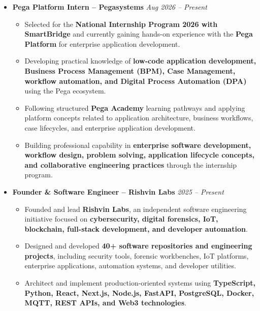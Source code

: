 \documentclass[a4paper,11pt]{article}
\newcommand{\resumeItem}[1]{
\item \small{#1 \vspace{-2pt}}
}
\begin{document}
\begin{itemize}[leftmargin=0in, label={}]

\item
\textbf{Pega Platform Intern -- Pegasystems}
\hfill \textit{Aug 2026 -- Present}

\begin{itemize}[leftmargin=*]

\resumeItem{Selected for the \textbf{National Internship Program 2026 with SmartBridge} and currently gaining hands-on experience with the \textbf{Pega Platform} for enterprise application development.}

\resumeItem{Developing practical knowledge of \textbf{low-code application development, Business Process Management (BPM), Case Management, workflow automation, and Digital Process Automation (DPA)} using the Pega ecosystem.}

\resumeItem{Following structured \textbf{Pega Academy} learning pathways and applying platform concepts related to application architecture, business workflows, case lifecycles, and enterprise application development.}

\resumeItem{Building professional capability in \textbf{enterprise software development, workflow design, problem solving, application lifecycle concepts, and collaborative engineering practices} through the internship program.}

\end{itemize}

\vspace{4pt}

\item
\textbf{Founder \& Software Engineer -- Rishvin Labs}
\hfill \textit{2025 -- Present}

\begin{itemize}[leftmargin=*]

\resumeItem{Founded and lead \textbf{Rishvin Labs}, an independent software engineering initiative focused on \textbf{cybersecurity, digital forensics, IoT, blockchain, full-stack development, and developer automation}.}

\resumeItem{Designed and developed \textbf{40+ software repositories and engineering projects}, including security tools, forensic workbenches, IoT platforms, enterprise applications, automation systems, and developer utilities.}

\resumeItem{Architect and implement production-oriented systems using \textbf{TypeScript, Python, React, Next.js, Node.js, FastAPI, PostgreSQL, Docker, MQTT, REST APIs, and Web3 technologies}.}


\end{itemize}
\end{itemize}
\end{document}

